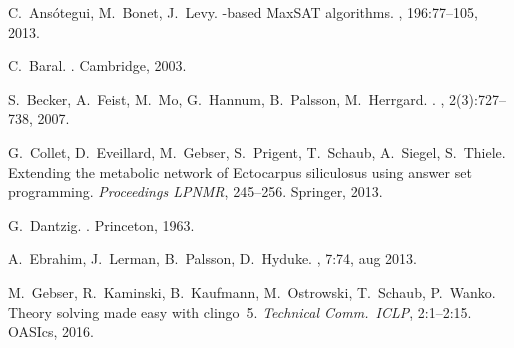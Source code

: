 \begin{thebibliography}{10}


C.~Ans{\'o}tegui, M.~Bonet, J.~Levy.
-based {MaxSAT} algorithms.
, 196:77--105, 2013.

C.~Baral.
.
\newblock Cambridge, 2003.

S.~Becker, A.~Feist, M.~Mo, G.~Hannum, B.~Palsson, M.~Herrgard.
.
, 2(3):727--738, 2007.

G.~Collet, D.~Eveillard, M.~Gebser, S.~Prigent, T.~Schaub, A.~Siegel, S.~Thiele.
\newblock Extending the metabolic network of {E}ctocarpus siliculosus using answer set programming.
\newblock 
{\em Proceedings LPNMR},
245--256. Springer, 2013.

G.~Dantzig.
.
\newblock Princeton, 1963.


A.~Ebrahim, J.~Lerman, B.~Palsson, D.~Hyduke.
, 7:74, aug 2013.

M.~Gebser, R.~Kaminski, B.~Kaufmann, M.~Ostrowski, T.~Schaub, P.~Wanko.
\newblock Theory solving made easy with clingo~5.
\newblock 
{\em Technical Comm.\ ICLP},
2:1--2:15. 
OASIcs, 2016.


\end{thebibliography}
